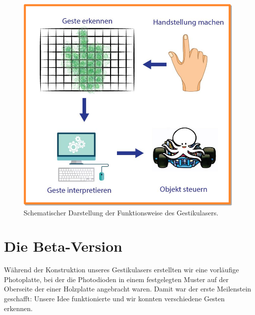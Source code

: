 \documentclass{sciposter}
\begin{document}
\begin{multicols}{3}
\begin{figure}[h]
	\centering
	\includegraphics[scale=1.3]{../figures/AblaufGestikulaser.png}
	\caption{Schematischer Darstellung der Funktionsweise des Gestikulasers.}
	\label{fig:FunktionsweiseGestikulaser}
\end{figure}

\section{Die Beta-Version}
Während der Konstruktion unseres Gestikulasers erstellten wir eine vorläufige Photoplatte, bei der die Photodioden in einem festgelegten Muster auf der Oberseite der einer Holzplatte angebracht waren. Damit war der erste Meilenstein geschafft: Unsere Idee funktionierte und wir konnten verschiedene Gesten erkennen.


\end{multicols}
\end{document}
